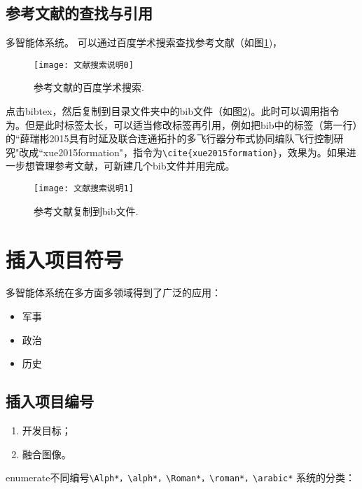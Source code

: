 \documentclass[master]{styles/hdu-thesis}
\begin{document}
\subsection{参考文献的查找与引用}


多智能体系统\citep{cao2011formation}。
可以通过百度学术搜索查找参考文献（如图\ref{fig_search0})，
 \begin{figure}[!htb]
  \centering
  \texttt{[image: 文献搜索说明0]}
  \caption{参考文献的百度学术搜索.}
  \label{fig_search0}
\end{figure}
点击bibtex，然后复制到目录文件夹中的bib文件（如图\ref{fig_search1})。此时可以调用指令为\citep{薛瑞彬2015具有时延及联合连通拓扑的多飞行器分布式协同编队飞行控制研究}。但是此时标签太长，可以适当修改标签再引用，例如把bib中的标签（第一行）的``薛瑞彬2015具有时延及联合连通拓扑的多飞行器分布式协同编队飞行控制研究"改成``xue2015formation"，指令为\verb+\cite{xue2015formation}+，效果为\cite{xue2015formation}。如果进一步想管理参考文献，可新建几个bib文件并用\verb++完成。
 \begin{figure}[!htb]
  \centering
  \texttt{[image: 文献搜索说明1]}
  \caption{参考文献复制到bib文件.}
  \label{fig_search1}
\end{figure}



\section{插入项目符号}

多智能体系统在多方面多领域得到了广泛的应用：
\begin{itemize}
  \item 军事
  \item 政治
  \item 历史
\end{itemize}

\subsection{插入项目编号}

\begin{enumerate}[leftmargin=2em,itemsep=2pt,topsep=0pt,parsep=0pt,label=\alph*)]
  \item 开发目标；
  \item 融合图像。
\end{enumerate}

enumerate不同编号\verb+\Alph*，\alph*，\Roman*，\roman*，\arabic*+
系统的分类：
\end{document}
